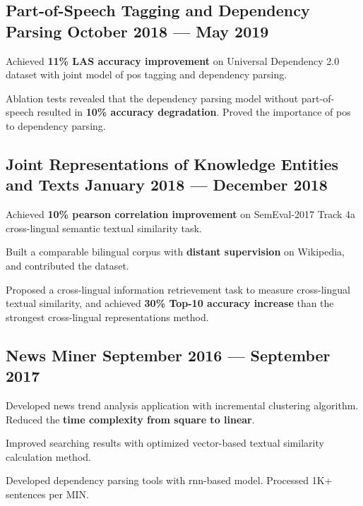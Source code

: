 \subsection*{Part-of-Speech Tagging and Dependency Parsing \hfill October 2018 --- May 2019} 
    \begin{zitemize}
        \item Achieved \textbf{11\% LAS accuracy improvement} on Universal Dependency 2.0 dataset with joint model of pos tagging and dependency parsing.
        \item Ablation tests revealed that the dependency parsing model without part-of-speech resulted in \textbf{10\% accuracy degradation}. Proved the importance of pos to dependency parsing.
    \end{zitemize}


\subsection*{Joint Representations of Knowledge Entities and Texts \hfill January 2018 --- December 2018} 
    \begin{zitemize}
        \item Achieved \textbf{10\% pearson correlation improvement} on SemEval-2017 Track 4a cross-lingual semantic textual similarity task.
        \item Built a comparable bilingual corpus with \textbf{distant supervision} on Wikipedia, and contributed the dataset.
        \item Proposed a cross-lingual information retrievement task to measure cross-lingual textual similarity, and achieved \textbf{30\% Top-10 accuracy increase} than the strongest cross-lingual representations method.
    \end{zitemize}


\subsection*{News Miner \hfill September 2016 --- September 2017} 
    \begin{zitemize}
        \item Developed news trend analysis application with incremental clustering algorithm. Reduced the \textbf{time complexity from square to linear}.
        \item Improved searching results with optimized vector-based textual similarity calculation method.
        \item Developed dependency parsing tools with rnn-based model. Processed 1K+ sentences per MIN.
    \end{zitemize}
